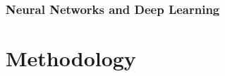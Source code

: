 \documentclass{article}
\begin{document}


\subsubsection{Neural Networks and Deep Learning}






















\section{Methodology}
\end{document}
